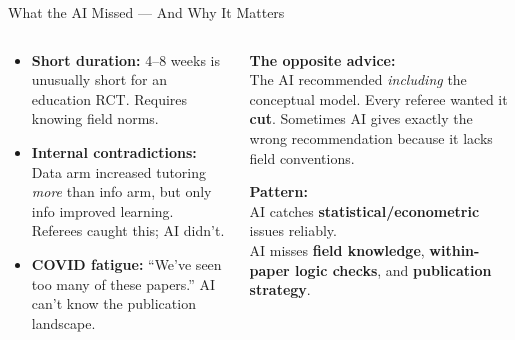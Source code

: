 \documentclass[aspectratio=169, 10pt]{beamer}
\begin{document}
\begin{frame}{What the AI Missed --- And Why It Matters}
\begin{columns}[T]
\begin{column}{0.47\textwidth}
\begin{tcolorbox}[colback=SoftCoral!8, colframe=SoftCoral, boxrule=0.8pt, arc=3pt,
  left=6pt, right=6pt, top=4pt, bottom=4pt,
  fonttitle=\bfseries\small\color{white}, coltitle=white, colbacktitle=SoftCoral,
  title={\faTimes\quad The Misses}]
\small
\begin{itemize}\setlength{\itemsep}{4pt}
  \item \textbf{Short duration:} 4--8 weeks is unusually short for an education RCT. Requires knowing field norms.
  \item \textbf{Internal contradictions:} Data arm increased tutoring \textit{more} than info arm, but only info improved learning. Referees caught this; AI didn't.
  \item \textbf{COVID fatigue:} ``We've seen too many of these papers.'' AI can't know the publication landscape.
\end{itemize}
\end{tcolorbox}
\end{column}
\begin{column}{0.47\textwidth}
\begin{tcolorbox}[quotebox]
\small
\textbf{The opposite advice:}\\[3pt]
The AI recommended \textit{including} the conceptual model. Every referee wanted it \textbf{cut}.
\vskip4pt
Sometimes AI gives exactly the wrong recommendation because it lacks field conventions.
\end{tcolorbox}
\vskip4pt
\begin{tcolorbox}[accentbox]
\small
\textbf{Pattern:}\\[2pt]
AI catches \textbf{statistical/econometric} issues reliably.\\[2pt]
AI misses \textbf{field knowledge}, \textbf{within-paper logic checks}, and \textbf{publication strategy}.
\end{tcolorbox}
\end{column}
\end{columns}
\end{frame}
\end{document}
